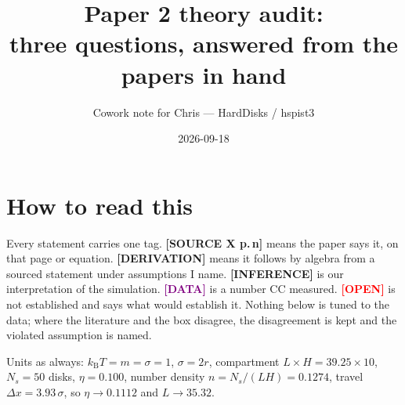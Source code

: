 \documentclass[11pt,a4paper]{article}
\title{Paper 2 theory audit:\\ three questions, answered from the papers in hand}
\author{Cowork note for Chris --- HardDisks / hspist3}
\date{2026-09-18}
\newcommand{\kT}{k_{\mathrm B}T}
\newcommand{\src}[1]{\textcolor{OliveGreen}{\textbf{[SOURCE #1]}}}
\newcommand{\der}{\textcolor{NavyBlue}{\textbf{[DERIVATION]}}}
\newcommand{\infr}{\textcolor{BurntOrange}{\textbf{[INFERENCE]}}}
\newcommand{\dat}{\textcolor{Purple}{\textbf{[DATA]}}}
\newcommand{\opn}{\textcolor{Red}{\textbf{[OPEN]}}}
\begin{document}
\maketitle

\section*{How to read this}
Every statement carries one tag. \src{X p.\,n} means the paper says it, on that page or equation. \der{} means it follows by algebra from a sourced statement under assumptions I name. \infr{} is our interpretation of the simulation. \dat{} is a number CC measured. \opn{} is not established and says what would establish it. Nothing below is tuned to the data; where the literature and the box disagree, the disagreement is kept and the violated assumption is named.

Units as always: $\kT = m = \sigma = 1$, $\sigma = 2r$, compartment $L\times H = 39.25\times 10$, $N_s = 50$ disks, $\eta = 0.100$, number density $n = N_s/(LH) = 0.1274$, travel $\Delta x = 3.93\,\sigma$, so $\eta \to 0.1112$ and $L \to 35.32$.
\end{document}
